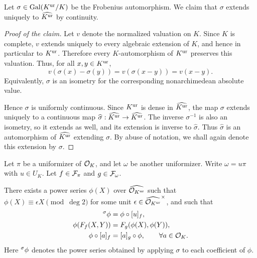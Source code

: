 Let $\sigma \in \mathrm{Gal}(K^{\mathrm{ur}}/K)$ be the Frobenius automorphism. We claim that
$\sigma$ extends uniquely to $\widehat{K^{\mathrm{ur}}}$ by continuity.

\begin{proof}[Proof of the claim]
    Let $v$ denote the normalized valuation on $K$. Since $K$ is complete,
    $v$ extends uniquely to every algebraic extension of $K$, and hence in
    particular to $K^{\mathrm{ur}}$. Therefore every $K$-automorphism of $K^{\mathrm{ur}}$ preserves
    this valuation. Thus, for all $x,y \in K^{\mathrm{ur}}$,
    \[
        v(\sigma(x)-\sigma(y)) = v(\sigma(x-y)) = v(x-y).
    \]
    Equivalently, $\sigma$ is an isometry for the corresponding
    nonarchimedean absolute value.

    Hence $\sigma$ is uniformly continuous. Since $K^{\mathrm{ur}}$ is dense in
    $\widehat{K^{\mathrm{ur}}}$, the map $\sigma$ extends uniquely to a continuous map
    $\widehat{\sigma}:\widehat{K^{\mathrm{ur}}}\to \widehat{K^{\mathrm{ur}}}$. The inverse
    $\sigma^{-1}$ is also an isometry, so it extends as well, and its extension
    is inverse to $\widehat{\sigma}$. Thus $\widehat{\sigma}$ is an
    automorphism of $\widehat{K^{\mathrm{ur}}}$ extending $\sigma$. By abuse of notation,
    we shall again denote this extension by $\sigma$.
\end{proof}

Let $\pi$ be a uniformizer of $\mathcal{O}_K$, and let $\omega$ be another
uniformizer. Write $\omega=u\pi$ with $u \in U_K$. Let
$f \in \mathcal{F}_\pi$ and $g \in \mathcal{F}_\omega$.

\begin{lemma}
    There exists a power series
    $\phi(X)$ over $\widehat{\mathcal{O}_{K^{\mathrm{ur}}}}$ such that
    $\phi(X) \equiv \epsilon X \pmod{\deg 2}$ for some unit
    $\epsilon \in \widehat{\mathcal{O}_{K^{\mathrm{ur}}}}^\times$, and such that
    \begin{align}
        {}^{\sigma}\phi &= \phi \circ [u]_f,
            \label{eq: phi_u} \\
        \phi(F_f(X,Y)) &= F_g(\phi(X),\phi(Y)),
            \label{eq: phi_hom_fg} \\
        \phi \circ [a]_f &= [a]_g \circ \phi,
            \qquad \forall a \in \mathcal{O}_K .
            \label{eq: phi_a}
    \end{align}
    Here ${}^{\sigma}\phi$ denotes the power series obtained by applying
    $\sigma$ to each coefficient of $\phi$.
    \label{lem: phi_lemma}
\end{lemma}

